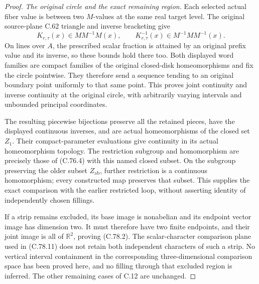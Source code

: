 \begin{proof}
\emph{The original circle and the exact remaining region.}
Each selected actual fiber value is between
two $M$-values at the same real target level.
The original source-plane C.62 triangle and
inverse bracketing give
\[
       K_{r,\tau}(x)\in M M^{-1}M(x),\qquad
       K_{r,\tau}^{-1}(x)\in M^{-1}M M^{-1}(x).
                                                               \tag{C.78.18}
\]
On lines over $A$, the prescribed scalar
fraction is attained by an original prefix
value and its inverse, so these bounds hold
there too. Both displayed word families are
compact families of the original closed-disk
homeomorphisms and fix the circle pointwise.
They therefore send a sequence tending to
an original boundary point uniformly to that
same point. This proves joint continuity
and inverse continuity at the original
circle, with arbitrarily varying intervals
and unbounded principal coordinates.

The resulting piecewise bijections preserve
all the retained pieces, have the displayed
continuous inverses, and are actual
homeomorphisms of the closed set $Z_1$.
Their compact-parameter evaluations give
continuity in its actual homeomorphism
topology. The restriction subgroup and
homomorphism are precisely those of (C.76.4)
with this named closed subset. On the subgroup
preserving the older subset $Z_{\mathrm{ab}}$,
further restriction is a continuous homomorphism;
every constructed map preserves that subset.
This supplies the exact comparison with the
earlier restricted loop, without asserting
identity of independently chosen fillings.

If a strip remains excluded, its base image
is nonabelian and its endpoint vector image
has dimension two. It must therefore have
two finite endpoints, and their joint image
is all of $\mathbb R^2$, proving (C.78.2).
The scalar-character comparison plane used
in (C.78.11) does not retain both independent
characters of such a strip. No vertical
interval containment in the corresponding
three-dimensional comparison space has
been proved here, and no filling through
that excluded region is inferred.
The other remaining cases of C.12 are
unchanged.
\end{proof}
